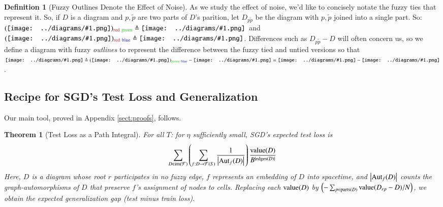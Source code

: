 \documentclass{article}
\theoremstyle{plain}
\newtheorem{thm}{Theorem}
\theoremstyle{definition}
\newtheorem{defn}{Definition}
\newcommand{\Free}{\mathcal{F}}
\newcommand{\Aut}{\text{\textnormal{Aut}}}
\newcommand{\image}{\text{\textnormal{im}}}
\newcommand{\dvalue}{\text{\textnormal{value}}}
\newcommand{\edges}{\text{\textnormal{edges}}}
\newcommand{\parts}{\text{\textnormal{parts}}}
\newcommand{\wrap}[1]{\left(#1\right)}
\newcommand{\wabs}[1]{\left|#1\right|}
\newcommand{\sdia}[1]{\begin{gathered}\texttt{[image: ../diagrams/\#1.png]}\end{gathered}}
\begin{document}
        \begin{defn}[Fuzzy Outlines Denote the Effect of Noise]
            As we study the effect of noise, we'd like to concisely notate the
            fuzzy ties that represent it.
            So, if $D$ is a diagram and $p, \tilde p$ are two parts of $D$'s
            parition, let $D_{p\tilde p}$ be the diagram with $p, \tilde p$
            joined into a single part.  So:
            $
                (\sdia{(0-1)(01)})_{\text{\color{moor}red}~\text{\color{moog}green}}
                \triangleq
                \sdia{(01)(01)}
            $
            and
            $
                (\sdia{(01-2-3)(02-12-23)})_{\text{\color{moor}red}~\text{\color{moob}blue}}
                \triangleq
                \sdia{(013-2)(02-12-23)}
            $.
            Differences such as $D_{p\tilde p}-D$ will often concern us, so we
            define a diagram with fuzzy \emph{outlines} to represent the
            difference between the fuzzy tied and untied versions so that
            $
                \sdia{c(0-12)(01-12)}
                \triangleq
                (\sdia{(0-1-2)(01-12)})_{\text{\color{moog}green}~\text{\color{moob}blue}}
                -
                \sdia{(0-1-2)(01-12)}
                =
                \sdia{(0-12)(01-12)}
                -
                \sdia{(0-1-2)(01-12)}
            $.
        \end{defn}
            

    \subsection{Recipe for SGD's Test Loss and Generalization}
        Our main tool, proved in Appendix \ref{sect:proofs}, follows.
        
        \begin{thm}[Test Loss as a Path Integral] \label{thm:sgdcoef}
            For all $T$: for $\eta$ sufficiently small, SGD's expected test
            loss is
            \begin{equation*}\label{eq:sgdcoef}
                \sum_{D \in \image(\Free)} \wrap{
                    \sum_{f: D\to\Free(S)}
                    \frac{1}{\wabs{\Aut_f(D)}}
                }
                \frac{\dvalue(D)}{B^{|\edges(D)|}}
            \end{equation*}
            Here, $D$ is a diagram whose root $r$ participates in no fuzzy
            edge,    $f$ represents an embedding of $D$ into spacetime, and
            $\wabs{\Aut_f(D)}$ counts the graph-automorphisms of $D$ that
            preserve $f$'s assignment of nodes to cells.
            Replacing each $\dvalue(D)$ by
            $
                \wrap{-\sum_{p \in \parts(D)} \dvalue(D_{rp} - D)/N}
            $,
            we obtain the expected generalization gap (test minus train
            loss).
        \end{thm}
    
\end{document}
